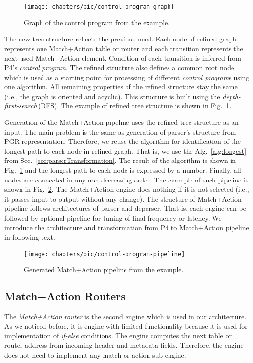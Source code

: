 \begin{figure}[ht]
	\centering
	\texttt{[image: chapters/pic/control-program-graph]}
	\caption{Graph of the control program from the example.}
	\label{fig:controlProgramGraph}
\end{figure}

The new tree structure reflects the previous need. Each node of refined graph represents one Match+Action table or router and each 
transition represents the next used Match+Action element. 
Condition of each transition is inferred from P4's \emph{control program}. 
The refined structure also defines a common root node which is used as a starting point for processing of different \emph{control program}s 
using one algorithm. 
All remaining properties of the refined structure stay the same (i.e., the graph is oriented  and acyclic). 
This structure is built using the \textit{depth-first-search}\,(DFS). 
The example of refined tree structure is shown in Fig.~\ref{fig:controlProgramGraph}.

Generation of the Match+Action pipeline uses the refined tree structure as an input. 
The main problem is the same as generation of parser's structure from PGR representation. 
Therefore, we reuse the algorithm for identification of the longest path to each node in refined graph.
That is, we use the Alg.~\ref{alg:longest} from Sec.~\ref{sec:parserTransformation}. 
The result of the algorithm is shown in Fig.~\ref{fig:controlProgramGraph} and the longest path to each node is expressed by a number.
Finally, all nodes are connected in any non-decreasing order. The example of such pipeline is shown in Fig.~\ref{fig:controlProgramPipeline}.
The Match+Action engine does nothing if it is not selected (i.e., it passes input to output without any change). The structure of Match+Action
pipeline follows architectures of parser and deparser. That is, each engine can be followed by optional pipeline for tuning of final frequency or 
latency. We introduce the architecture and transformation from P4 to Match+Action pipeline in following text.

\begin{figure}[h]
    \centering
    \texttt{[image: chapters/pic/control-program-pipeline]}
    \caption{Generated Match+Action pipeline from the example.}
    \label{fig:controlProgramPipeline}
\end{figure}

\subsection{Match+Action Routers}
\label{sec:matchActionRouters}
The \textit{Match+Action router} is the second engine which is used in our architecture. As we noticed before, it is engine with limited functionality because
it is used for implementation of \textit{if-else} conditions. 
The engine computes the next table or router address from incoming header and metadata fields. 
Therefore, the engine does not need to implement any match or action sub-engine. 

